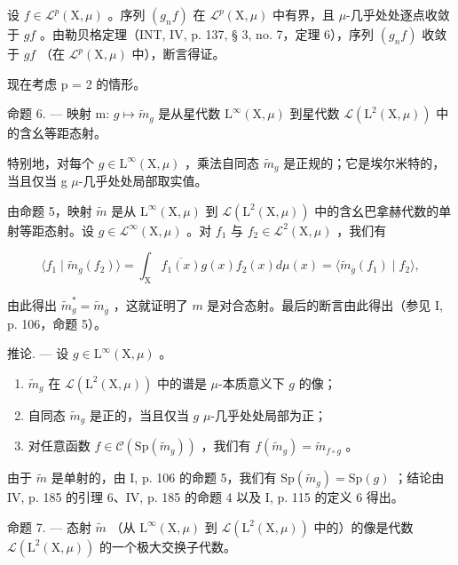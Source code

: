 设 \(f \in \mathcal{L}^p(\mathrm{X},\mu)\) 。序列 \((g_{n}f)\) 在 \(\mathcal{L}^p(\mathrm{X},\mu)\) 中有界，且 \(\mu\)-几乎处处逐点收敛于 \(gf\) 。由勒贝格定理（INT, IV, p. 137, § 3, no. 7，定理 6），序列 \((g_{n}f)\) 收敛于 \(gf\) （在 \(\mathcal{L}^p(\mathrm{X},\mu)\) 中），断言得证。

现在考虑 p = 2 的情形。

命题 6. --- 映射 m: \(g \mapsto \widetilde{m}_{g}\) 是从星代数 \(\mathrm{L}^{\infty}(\mathrm{X}, \mu)\) 到星代数 \(\mathcal{L}(\mathrm{L}^{2}(\mathrm{X}, \mu))\) 中的含幺等距态射。

特别地，对每个 \(g \in \mathrm{L}^{\infty}(\mathrm{X}, \mu)\) ，乘法自同态 \(\widetilde{m}_{g}\) 是正规的；它是埃尔米特的，当且仅当 g \(\mu\)-几乎处处局部取实值。

由命题 5，映射 \(\tilde{m}\) 是从 \(\mathrm{L}^{\infty}(\mathrm{X},\mu)\) 到 \(\mathcal{L}(\mathrm{L}^{2}(\mathrm{X},\mu))\) 中的含幺巴拿赫代数的单射等距态射。设 \(g\in \mathcal{L}^{\infty}(\mathrm{X},\mu)\) 。对 \(f_{1}\) 与 \(f_{2}\in \mathcal{L}^{2}(\mathrm{X},\mu)\) ，我们有

\[
\langle f _ {1} \mid \widetilde {m} _ {g} (f _ {2}) \rangle = \int_ {\mathrm{X}} \overline {{f _ {1} (x)}} g (x) f _ {2} (x) d \mu (x) = \langle \widetilde {m} _ {\overline {{g}}} (f _ {1}) \mid f _ {2} \rangle ,
\]

由此得出 \(\widetilde{m}_g^* = \widetilde{m}_{\overline{g}}\) ，这就证明了 \(m\) 是对合态射。最后的断言由此得出（参见 I, p. 106，命题 5）。

推论. --- 设 \(g \in \mathrm{L}^{\infty}(\mathrm{X},\mu)\) 。

\begin{enumerate}
\def\labelenumi{\alph{enumi})}
\item
  \(\widetilde{m}_g\) 在 \(\mathcal{L}(\mathrm{L}^2 (\mathrm{X},\mu))\) 中的谱是 \(\mu\)-本质意义下 \(g\) 的像；
\item
  自同态 \(\widetilde{m}_g\) 是正的，当且仅当 \(g\) \(\mu\)-几乎处处局部为正；
\item
  对任意函数 \(f \in \mathcal{C}(\mathrm{Sp}(\widetilde{m}_g))\) ，我们有 \(f(\widetilde{m}_g) = \widetilde{m}_{f \circ g}\) 。
\end{enumerate}

由于 \(\widetilde{m}\) 是单射的，由 I, p. 106 的命题 5，我们有 \(\mathrm{Sp}(\widetilde{m}_{g}) = \mathrm{Sp}(g)\) ；结论由 IV, p. 185 的引理 6、IV, p. 185 的命题 4 以及 I, p. 115 的定义 6 得出。

命题 7. --- 态射 \(\tilde{m}\) （从 \(\mathrm{L}^{\infty}(\mathrm{X},\mu)\) 到 \(\mathcal{L}(\mathrm{L}^{2}(\mathrm{X},\mu))\) 中的）的像是代数 \(\mathcal{L}(\mathrm{L}^{2}(\mathrm{X},\mu))\) 的一个极大交换子代数。

